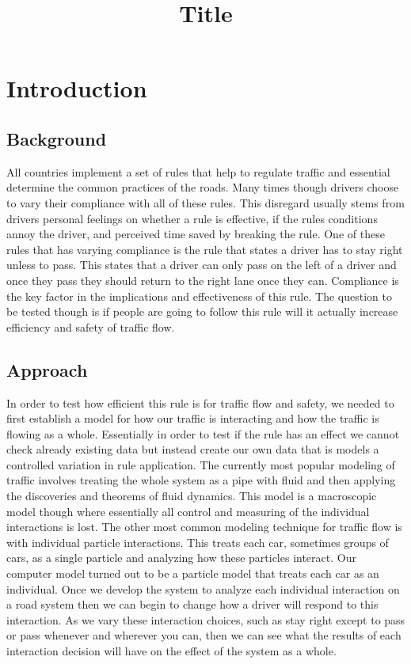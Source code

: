 \documentclass{amsart}
\title{Title}
\begin{document}

\maketitle

\section{\bfseries{Introduction}}
	\subsection{Background}
		All countries implement a set of rules that help to regulate traffic and essential determine the common practices of the roads.  Many times though drivers choose to vary their compliance with all of these rules.  This disregard usually stems from drivers personal feelings on whether a rule is effective, if the rules conditions annoy the driver, and perceived time saved by breaking the rule.  One of these rules that has varying compliance is the rule that states a driver has to stay right unless to pass.  This states that a driver can only pass on the left of a driver and once they pass they should return to the right lane once they can.  Compliance is the key factor in the implications and effectiveness of this rule.  The question to be tested though is if people are going to follow this rule will it actually increase efficiency and safety of traffic flow. 
	
	\subsection{Approach}
		In order to test how efficient this rule is for traffic flow and safety, we needed to first establish a model for how our traffic is interacting and how the traffic is flowing as a whole. Essentially in order to test if the rule has an effect we cannot check already existing data but instead create our own data that is models a controlled variation in rule application. The currently most popular modeling of traffic involves treating the whole system as a pipe with fluid and then applying the discoveries and theorems of fluid dynamics.  This model is a macroscopic model though where essentially all control and measuring of the individual interactions is lost.  The other most common modeling technique for traffic flow is with individual particle interactions.  This treats each car, sometimes groups of cars, as a single particle and analyzing how these particles interact.  Our computer model turned out to be a particle model that treats each car as an individual.  Once we develop the system to analyze each individual interaction on a road system then we can begin to change how a driver will respond to this interaction.  As we vary these interaction choices, such as stay right except to pass or pass whenever and wherever you can, then we can see what the results of each interaction decision will have on the effect of the system as a whole.  
\end{document}
